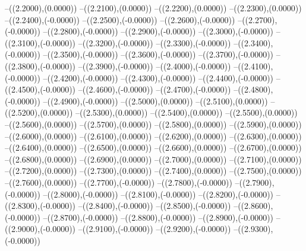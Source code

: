 {	--({\sx*(2.2000)},{\sy*(0.0000)})
	--({\sx*(2.2100)},{\sy*(0.0000)})
	--({\sx*(2.2200)},{\sy*(0.0000)})
	--({\sx*(2.2300)},{\sy*(0.0000)})
	--({\sx*(2.2400)},{\sy*(-0.0000)})
	--({\sx*(2.2500)},{\sy*(-0.0000)})
	--({\sx*(2.2600)},{\sy*(-0.0000)})
	--({\sx*(2.2700)},{\sy*(-0.0000)})
	--({\sx*(2.2800)},{\sy*(-0.0000)})
	--({\sx*(2.2900)},{\sy*(-0.0000)})
	--({\sx*(2.3000)},{\sy*(-0.0000)})
	--({\sx*(2.3100)},{\sy*(-0.0000)})
	--({\sx*(2.3200)},{\sy*(-0.0000)})
	--({\sx*(2.3300)},{\sy*(-0.0000)})
	--({\sx*(2.3400)},{\sy*(-0.0000)})
	--({\sx*(2.3500)},{\sy*(-0.0000)})
	--({\sx*(2.3600)},{\sy*(-0.0000)})
	--({\sx*(2.3700)},{\sy*(-0.0000)})
	--({\sx*(2.3800)},{\sy*(-0.0000)})
	--({\sx*(2.3900)},{\sy*(-0.0000)})
	--({\sx*(2.4000)},{\sy*(-0.0000)})
	--({\sx*(2.4100)},{\sy*(-0.0000)})
	--({\sx*(2.4200)},{\sy*(-0.0000)})
	--({\sx*(2.4300)},{\sy*(-0.0000)})
	--({\sx*(2.4400)},{\sy*(-0.0000)})
	--({\sx*(2.4500)},{\sy*(-0.0000)})
	--({\sx*(2.4600)},{\sy*(-0.0000)})
	--({\sx*(2.4700)},{\sy*(-0.0000)})
	--({\sx*(2.4800)},{\sy*(-0.0000)})
	--({\sx*(2.4900)},{\sy*(-0.0000)})
	--({\sx*(2.5000)},{\sy*(0.0000)})
	--({\sx*(2.5100)},{\sy*(0.0000)})
	--({\sx*(2.5200)},{\sy*(0.0000)})
	--({\sx*(2.5300)},{\sy*(0.0000)})
	--({\sx*(2.5400)},{\sy*(0.0000)})
	--({\sx*(2.5500)},{\sy*(0.0000)})
	--({\sx*(2.5600)},{\sy*(0.0000)})
	--({\sx*(2.5700)},{\sy*(0.0000)})
	--({\sx*(2.5800)},{\sy*(0.0000)})
	--({\sx*(2.5900)},{\sy*(0.0000)})
	--({\sx*(2.6000)},{\sy*(0.0000)})
	--({\sx*(2.6100)},{\sy*(0.0000)})
	--({\sx*(2.6200)},{\sy*(0.0000)})
	--({\sx*(2.6300)},{\sy*(0.0000)})
	--({\sx*(2.6400)},{\sy*(0.0000)})
	--({\sx*(2.6500)},{\sy*(0.0000)})
	--({\sx*(2.6600)},{\sy*(0.0000)})
	--({\sx*(2.6700)},{\sy*(0.0000)})
	--({\sx*(2.6800)},{\sy*(0.0000)})
	--({\sx*(2.6900)},{\sy*(0.0000)})
	--({\sx*(2.7000)},{\sy*(0.0000)})
	--({\sx*(2.7100)},{\sy*(0.0000)})
	--({\sx*(2.7200)},{\sy*(0.0000)})
	--({\sx*(2.7300)},{\sy*(0.0000)})
	--({\sx*(2.7400)},{\sy*(0.0000)})
	--({\sx*(2.7500)},{\sy*(0.0000)})
	--({\sx*(2.7600)},{\sy*(0.0000)})
	--({\sx*(2.7700)},{\sy*(-0.0000)})
	--({\sx*(2.7800)},{\sy*(-0.0000)})
	--({\sx*(2.7900)},{\sy*(-0.0000)})
	--({\sx*(2.8000)},{\sy*(-0.0000)})
	--({\sx*(2.8100)},{\sy*(-0.0000)})
	--({\sx*(2.8200)},{\sy*(-0.0000)})
	--({\sx*(2.8300)},{\sy*(-0.0000)})
	--({\sx*(2.8400)},{\sy*(-0.0000)})
	--({\sx*(2.8500)},{\sy*(-0.0000)})
	--({\sx*(2.8600)},{\sy*(-0.0000)})
	--({\sx*(2.8700)},{\sy*(-0.0000)})
	--({\sx*(2.8800)},{\sy*(-0.0000)})
	--({\sx*(2.8900)},{\sy*(-0.0000)})
	--({\sx*(2.9000)},{\sy*(-0.0000)})
	--({\sx*(2.9100)},{\sy*(-0.0000)})
	--({\sx*(2.9200)},{\sy*(-0.0000)})
	--({\sx*(2.9300)},{\sy*(-0.0000)})
}
